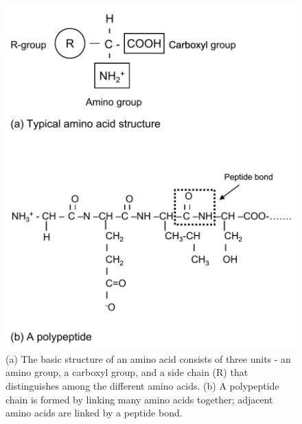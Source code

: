 \documentclass[11pt,ignorenonframetext,aspectratio=169]{beamer}
\begin{document}
\begin{frame}{}
\protect\hypertarget{section-22}{}

\begin{figure}
\includegraphics[width=0.45\linewidth]{../images/polypeptides_amino_acid} \caption{(a) The basic structure of an amino acid consists of three units - an amino group, a carboxyl group, and a side chain (R) that distinguishes among the different amino acids. (b) A polypeptide chain is formed by linking many amino acids together; adjacent amino acids are linked by a peptide bond.}\label{fig:polypeptides-amino}
\end{figure}

\end{frame}
\end{document}
